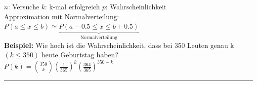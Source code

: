       $n$: Versuche \hspace{10mm}
      $k$: k-mal erfolgreich \hspace{10mm}
      $p$: Wahrscheinlichkeit\\
      
      Approximation mit Normalverteilung: $P(a \leq x \leq b) \simeq \underbrace{P(a-0.5 \leq x \leq b+0.5)}_{\text{Normalverteilung}}$\\
      
      {\bf Beispiel:} Wie hoch ist die Wahrscheinlichkeit, dass bei 350 Leuten genau
      k $(k\leq 350)$ heute Geburtstag haben?\\
      $P(k)=\binom {350} k \left(\frac{1}{365}\right)^k
      \left(\frac{364}{365}\right)^{350-k}$ \\



\hrule
